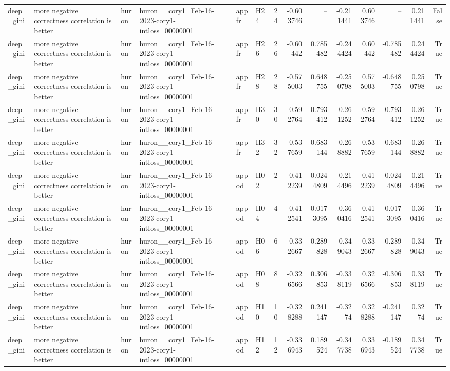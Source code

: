\begin{longtable}{llllllrrrrrrrr}
deep\_gini & more negative correctness correlation is better & huron & huron\_\_cory1\_Feb-16-2023-cory1-intloss\_00000001 & appfr & H24 & 24 & -0.603746 & -- & -0.211441 & 0.603746 & -- & 0.211441 & False \\
deep\_gini & more negative correctness correlation is better & huron & huron\_\_cory1\_Feb-16-2023-cory1-intloss\_00000001 & appfr & H26 & 26 & -0.60442 & 0.785482 & -0.244424 & 0.60442 & -0.785482 & 0.244424 & True \\
deep\_gini & more negative correctness correlation is better & huron & huron\_\_cory1\_Feb-16-2023-cory1-intloss\_00000001 & appfr & H28 & 28 & -0.575003 & 0.648755 & -0.250798 & 0.575003 & -0.648755 & 0.250798 & True \\
deep\_gini & more negative correctness correlation is better & huron & huron\_\_cory1\_Feb-16-2023-cory1-intloss\_00000001 & appfr & H30 & 30 & -0.592764 & 0.793412 & -0.261252 & 0.592764 & -0.793412 & 0.261252 & True \\
deep\_gini & more negative correctness correlation is better & huron & huron\_\_cory1\_Feb-16-2023-cory1-intloss\_00000001 & appfr & H32 & 32 & -0.537659 & 0.683144 & -0.268882 & 0.537659 & -0.683144 & 0.268882 & True \\
deep\_gini & more negative correctness correlation is better & huron & huron\_\_cory1\_Feb-16-2023-cory1-intloss\_00000001 & appod & H02 & 2 & -0.412239 & 0.0244809 & -0.214496 & 0.412239 & -0.0244809 & 0.214496 & True \\
deep\_gini & more negative correctness correlation is better & huron & huron\_\_cory1\_Feb-16-2023-cory1-intloss\_00000001 & appod & H04 & 4 & -0.412541 & 0.0173095 & -0.360416 & 0.412541 & -0.0173095 & 0.360416 & True \\
deep\_gini & more negative correctness correlation is better & huron & huron\_\_cory1\_Feb-16-2023-cory1-intloss\_00000001 & appod & H06 & 6 & -0.332667 & 0.289828 & -0.349043 & 0.332667 & -0.289828 & 0.349043 & True \\
deep\_gini & more negative correctness correlation is better & huron & huron\_\_cory1\_Feb-16-2023-cory1-intloss\_00000001 & appod & H08 & 8 & -0.326566 & 0.306853 & -0.338119 & 0.326566 & -0.306853 & 0.338119 & True \\
deep\_gini & more negative correctness correlation is better & huron & huron\_\_cory1\_Feb-16-2023-cory1-intloss\_00000001 & appod & H10 & 10 & -0.328288 & 0.241147 & -0.3274 & 0.328288 & -0.241147 & 0.3274 & True \\
deep\_gini & more negative correctness correlation is better & huron & huron\_\_cory1\_Feb-16-2023-cory1-intloss\_00000001 & appod & H12 & 12 & -0.336943 & 0.189524 & -0.347738 & 0.336943 & -0.189524 & 0.347738 & True \\

\end{longtable}
